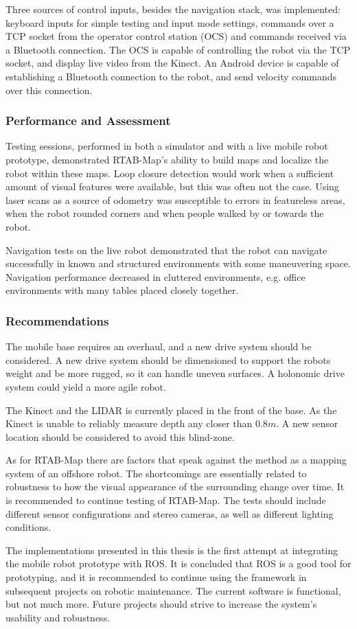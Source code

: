 Three sources of control inputs, besides the navigation stack, was implemented: keyboard inputs for simple testing and input mode settings, commands over a TCP socket from the operator control station (\ac{OCS}) and commands received via a Bluetooth connection. The \ac{OCS} is capable of controlling the robot via the TCP socket, and display live video from the Kinect. An Android device is capable of establishing a Bluetooth connection to the robot, and send velocity commands over this connection.

\subsubsection{Performance and Assessment}

Testing sessions, performed in both a simulator and with a live mobile robot prototype, demonstrated \ac{RTAB-Map}'s ability to build maps and localize the robot within these maps.  Loop closure detection would work when a sufficient amount of visual features were available, but this was often not the case. Using laser scans as a source of odometry was susceptible to errors in featureless areas, when the robot rounded corners and when people walked by or towards the robot. 

Navigation tests on the live robot demonstrated that the robot can navigate successfully in known and structured environments with some maneuvering space. Navigation performance decreased in cluttered environments, e.g. office environments with many tables placed closely together.

\subsubsection{Recommendations}

The mobile base requires an overhaul, and a new drive system should be considered. A new drive system should be dimensioned to support the robots weight and be more rugged, so it can handle uneven surfaces. A holonomic drive system could yield a more agile robot. 

The Kinect and the LIDAR is currently placed in the front of the base. As the Kinect is unable to reliably measure depth any closer than $0.8 m$. A new sensor location should be considered to avoid this blind-zone.

As for \ac{RTAB-Map} there are factors that speak against the method as a mapping system of an offshore robot. The shortcomings  are essentially related to robustness to how the visual appearance of the surrounding change over time. It is recommended to continue testing of \ac{RTAB-Map}. The tests should include different sensor configurations and stereo cameras, as well as different lighting conditions.

The implementations presented in this thesis is the first attempt at integrating the mobile robot prototype with \ac{ROS}. It is concluded that \ac{ROS} is a good tool for prototyping, and it is recommended to continue using the framework in subsequent projects on robotic maintenance. The current software is functional, but not much more. Future projects should strive to increase the system's usability and robustness.

